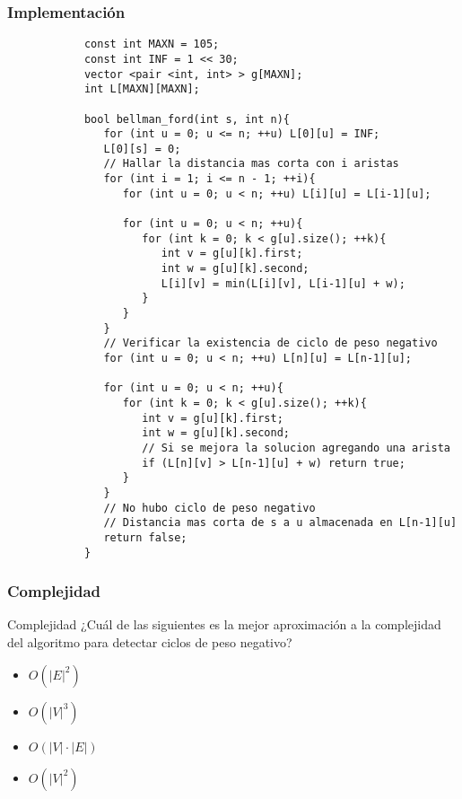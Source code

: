 \documentclass{beamer}
\begin{document}
	\begin{frame}
		\frametitle{Implementación}
		\begin{lstlisting}
			const int MAXN = 105;
			const int INF = 1 << 30;
			vector <pair <int, int> > g[MAXN];
			int L[MAXN][MAXN];

			bool bellman_ford(int s, int n){
			   for (int u = 0; u <= n; ++u) L[0][u] = INF;
			   L[0][s] = 0;
			   // Hallar la distancia mas corta con i aristas
			   for (int i = 1; i <= n - 1; ++i){
			      for (int u = 0; u < n; ++u) L[i][u] = L[i-1][u];

			      for (int u = 0; u < n; ++u){
			         for (int k = 0; k < g[u].size(); ++k){
			            int v = g[u][k].first;
			            int w = g[u][k].second;
			            L[i][v] = min(L[i][v], L[i-1][u] + w);
			         }
			      }
			   }
			   // Verificar la existencia de ciclo de peso negativo
			   for (int u = 0; u < n; ++u) L[n][u] = L[n-1][u];
			   
			   for (int u = 0; u < n; ++u){
			      for (int k = 0; k < g[u].size(); ++k){
			         int v = g[u][k].first;
			         int w = g[u][k].second;
			         // Si se mejora la solucion agregando una arista
			         if (L[n][v] > L[n-1][u] + w) return true;
			      }
			   }
			   // No hubo ciclo de peso negativo
			   // Distancia mas corta de s a u almacenada en L[n-1][u]
			   return false;
			}
		\end{lstlisting}
	\end{frame}
	
	\begin{frame}
		\frametitle{Complejidad}
		\begin{alertblock}{Complejidad}
			¿Cuál de las siguientes es la mejor aproximación a la complejidad del algoritmo para detectar ciclos de peso negativo?
			\begin{itemize}
				\item<1> [a] $O(|E| ^ 2)$
				\item<1> [b] $O(|V| ^ 3)$
				\item<1,2> [c] $O(|V| \cdot |E|)$
				\item<1> [d] $O(|V|^2)$
			\end{itemize}
		\end{alertblock}
	\end{frame}
	
\end{document}
